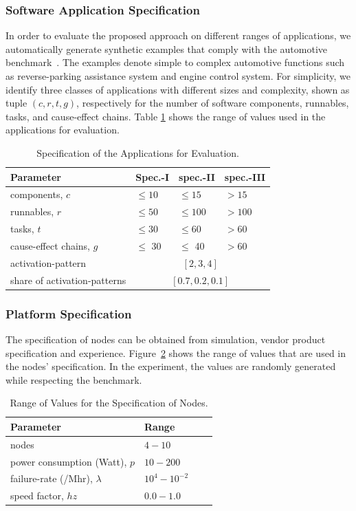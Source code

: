 \subsubsection{Software Application Specification} In order to evaluate the proposed approach on different ranges of applications, we automatically generate synthetic examples that comply with the automotive benchmark~\cite{Kramer2015RealFree}. The examples denote simple to complex automotive functions such as reverse-parking assistance system and engine control system. For simplicity, we identify three classes of applications with different sizes and complexity, shown as tuple $(c, r, t, g)$, respectively for the number of software components, runnables, tasks, and cause-effect chains. Table \ref{tbl_appsspec} shows the range of values used in the applications for evaluation. 
\begin{table}[h]
\centering\small
\begin{tabular}{@{}llll@{}}
\toprule
Parameter  		& Spec.-I  & spec.-II & spec.-III\\ 
\midrule
components, $c$		& $\leq 10$	& $\leq 15$ 	& $> 15$\\ 
runnables, $r$		& $\leq 50$	& $\leq 100$ 	& $> 100$\\
tasks, $t$ 			& $\leq 30$ & $\leq 60$ 	& $> 60$\\
cause-effect chains, $g$ & $\leq$ 30 & $\leq$ 40 & $> 60$\\ \midrule
activation-pattern	& \multicolumn{3}{c}{$[2,3,4]$}\\ \midrule
share of activation-patterns	& \multicolumn{3}{c}{$[0.7, 0.2, 0.1]$}\\
\bottomrule
\end{tabular}
\caption{Specification of the Applications for Evaluation.}
\label{tbl_appsspec}
\end{table}


\subsubsection{Platform Specification} The specification of nodes can be obtained from simulation, vendor product specification and  experience. Figure~\ref{tbl_nodesspecs} shows the range of values that are used in the nodes' specification. In the experiment, the values are randomly generated while respecting the benchmark.
\begin{table}[h]
\centering\small
\begin{tabular}{@{}llll@{}}
\toprule
Parameter  		& Range\\ 
\midrule
nodes							& $4-10$\\
power consumption (Watt), $p$ 	& $10 - 200$\\
failure-rate (/Mhr), $\lambda$ 	& $10^4 - 10^{-2}$\\
speed factor, $hz$			 	& $0.0 - 1.0$\\
\bottomrule
\end{tabular}
\caption{Range of Values for the Specification of Nodes.}
\label{tbl_nodesspecs}
\end{table}

